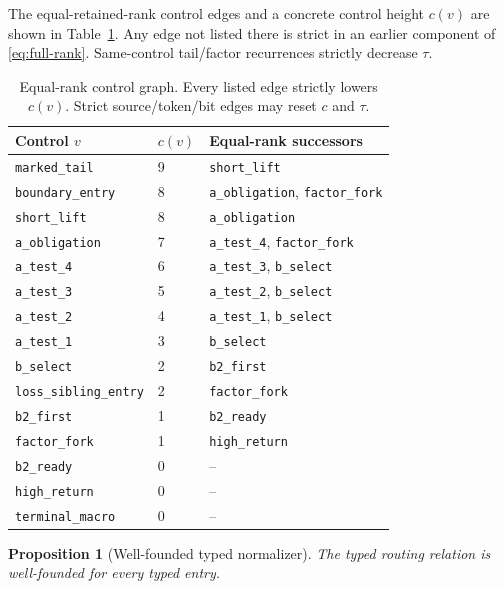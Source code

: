 \documentclass[11pt]{article}
\newtheorem{proposition}[theorem]{Proposition}
\begin{document}
The equal-retained-rank control edges and a concrete control height $c(v)$ are
shown in Table~\ref{tab:control}. Any edge not listed there is strict in an
earlier component of \eqref{eq:full-rank}. Same-control tail/factor recurrences
strictly decrease $\tau$.

\begin{table}[ht]
\centering
\small
\begin{tabular}{@{}lll@{}}
\toprule
Control $v$ & $c(v)$ & Equal-rank successors \\
\midrule
\texttt{marked\_tail} & 9 & \texttt{short\_lift} \\
\texttt{boundary\_entry} & 8 & \texttt{a\_obligation}, \texttt{factor\_fork} \\
\texttt{short\_lift} & 8 & \texttt{a\_obligation} \\
\texttt{a\_obligation} & 7 & \texttt{a\_test\_4}, \texttt{factor\_fork} \\
\texttt{a\_test\_4} & 6 & \texttt{a\_test\_3}, \texttt{b\_select} \\
\texttt{a\_test\_3} & 5 & \texttt{a\_test\_2}, \texttt{b\_select} \\
\texttt{a\_test\_2} & 4 & \texttt{a\_test\_1}, \texttt{b\_select} \\
\texttt{a\_test\_1} & 3 & \texttt{b\_select} \\
\texttt{b\_select} & 2 & \texttt{b2\_first} \\
\texttt{loss\_sibling\_entry} & 2 & \texttt{factor\_fork} \\
\texttt{b2\_first} & 1 & \texttt{b2\_ready} \\
\texttt{factor\_fork} & 1 & \texttt{high\_return} \\
\texttt{b2\_ready} & 0 & -- \\
\texttt{high\_return} & 0 & -- \\
\texttt{terminal\_macro} & 0 & -- \\
\bottomrule
\end{tabular}
\caption{Equal-rank control graph. Every listed edge strictly lowers $c(v)$.
Strict source/token/bit edges may reset $c$ and $\tau$.}
\label{tab:control}
\end{table}

\begin{proposition}[Well-founded typed normalizer]\label{prop:typed-normalizer}
The typed routing relation is well-founded for every typed entry.
\end{proposition}
\end{document}
